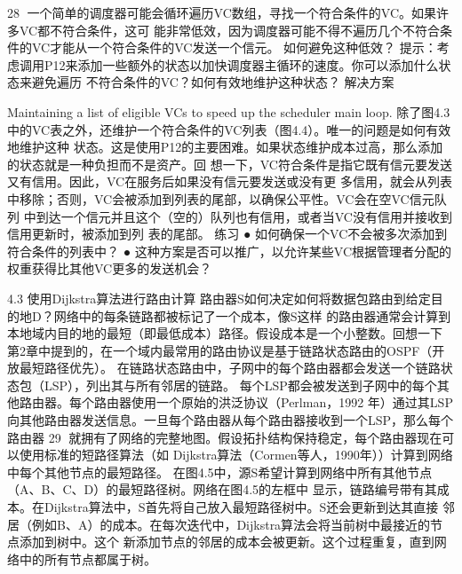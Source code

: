                                                                                            28
一个简单的调度器可能会循环遍历VC数组，寻找一个符合条件的VC。如果许多VC都不符合条件，这可
能非常低效，因为调度器可能不得不遍历几个不符合条件的VC才能从一个符合条件的VC发送一个信元。
如何避免这种低效？
提示：考虑调用P12来添加一些额外的状态以加快调度器主循环的速度。你可以添加什么状态来避免遍历
不符合条件的VC？如何有效地维护这种状态？
解决方案




Maintaining a list of eligible VCs to speed up the scheduler main loop.
除了图4.3中的VC表之外，还维护一个符合条件的VC列表（图4.4）。唯一的问题是如何有效地维护这种
状态。这是使用P12的主要困难。如果状态维护成本过高，那么添加的状态就是一种负担而不是资产。回
想一下，VC符合条件是指它既有信元要发送又有信用。因此，VC在服务后如果没有信元要发送或没有更
多信用，就会从列表中移除；否则，VC会被添加到列表的尾部，以确保公平性。VC会在空VC信元队列
中到达一个信元并且这个（空的）队列也有信用，或者当VC没有信用并接收到信用更新时，被添加到列
表的尾部。
练习
 ● 如何确保一个VC不会被多次添加到符合条件的列表中？
 ● 这种方案是否可以推广，以允许某些VC根据管理者分配的权重获得比其他VC更多的发送机会？



4.3 使用Dijkstra算法进行路由计算
路由器S如何决定如何将数据包路由到给定目的地D？网络中的每条链路都被标记了一个成本，像S这样
的路由器通常会计算到本地域内目的地的最短（即最低成本）路径。假设成本是一个小整数。回想一下
第2章中提到的，在一个域内最常用的路由协议是基于链路状态路由的OSPF（开放最短路径优先）。
在链路状态路由中，子网中的每个路由器都会发送一个链路状态包（LSP），列出其与所有邻居的链路。
每个LSP都会被发送到子网中的每个其他路由器。每个路由器使用一个原始的洪泛协议（Perlman，1992
年）通过其LSP向其他路由器发送信息。一旦每个路由器从每个路由器接收到一个LSP，那么每个路由器
                                                                     29
就拥有了网络的完整地图。假设拓扑结构保持稳定，每个路由器现在可以使用标准的短路径算法（如
Dijkstra算法（Cormen等人，1990年））计算到网络中每个其他节点的最短路径。
在图4.5中，源S希望计算到网络中所有其他节点（A、B、C、D）的最短路径树。网络在图4.5的左框中
显示，链路编号带有其成本。在Dijkstra算法中，S首先将自己放入最短路径树中。S还会更新到达其直接
邻居（例如B、A）的成本。在每次迭代中，Dijkstra算法会将当前树中最接近的节点添加到树中。这个
新添加节点的邻居的成本会被更新。这个过程重复，直到网络中的所有节点都属于树。




